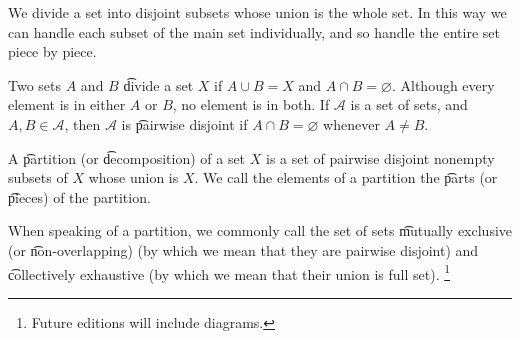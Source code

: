 
We divide a set into disjoint subsets whose union is the whole set.
In this way we can handle each subset of the main set individually, and so handle the entire set piece by piece.

Two sets $A$ and $B$ \t{divide} a set $X$ if $A \cup B = X$ and $A \cap B = \varnothing$.
Although every element is in either $A$ or $B$, no element is in both.
If $\mathcal{A} $ is a set of sets, and $A, B \in \mathcal{A} $, then $\mathcal{A} $ is \t{pairwise disjoint} if $A \cap B = \varnothing$ whenever $A \neq B$.

A \t{partition} (or \t{decomposition}) of a set $X$ is a set of pairwise disjoint nonempty subsets of $X$ whose union is $X$.
We call the elements of a partition the \t{parts} (or \t{pieces}) of the partition.

When speaking of a partition, we commonly call the set of sets \t{mutually exclusive} (or \t{non-overlapping}) (by which we mean that they are pairwise disjoint) and \t{collectively exhaustive} (by which we mean that their union is full set).
  \ifhmode\unskip\fi\footnote{
Future editions will include diagrams.
  }

\blankpage
